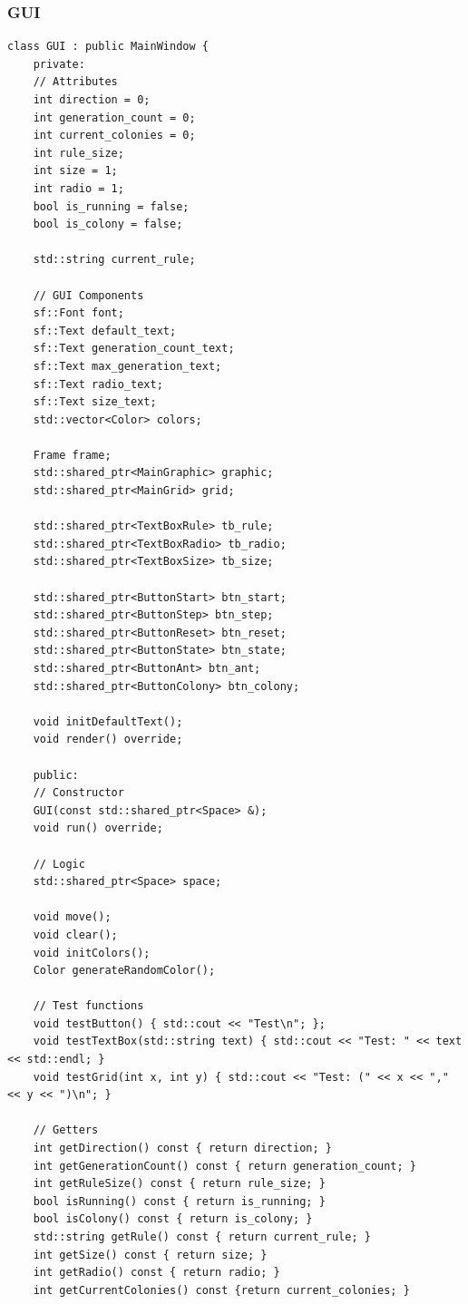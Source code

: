 \documentclass[12pt,twoside]{article}
\begin{document}
\subsubsection{GUI}

\begin{lstlisting}[caption={GUI.hpp}, label={lst:cppexample}]
class GUI : public MainWindow {
	private:
	// Attributes
	int direction = 0;
	int generation_count = 0;
	int current_colonies = 0;
	int rule_size;
	int size = 1;
	int radio = 1;
	bool is_running = false;
	bool is_colony = false;
	
	std::string current_rule;
	
	// GUI Components
	sf::Font font;
	sf::Text default_text;
	sf::Text generation_count_text;
	sf::Text max_generation_text;
	sf::Text radio_text;
	sf::Text size_text;
	std::vector<Color> colors;
	
	Frame frame;
	std::shared_ptr<MainGraphic> graphic;
	std::shared_ptr<MainGrid> grid;
	
	std::shared_ptr<TextBoxRule> tb_rule;
	std::shared_ptr<TextBoxRadio> tb_radio;
	std::shared_ptr<TextBoxSize> tb_size;
	
	std::shared_ptr<ButtonStart> btn_start;
	std::shared_ptr<ButtonStep> btn_step;
	std::shared_ptr<ButtonReset> btn_reset;
	std::shared_ptr<ButtonState> btn_state;
	std::shared_ptr<ButtonAnt> btn_ant;
	std::shared_ptr<ButtonColony> btn_colony;
	
	void initDefaultText();
	void render() override;
	
	public:
	// Constructor
	GUI(const std::shared_ptr<Space> &);
	void run() override;
	
	// Logic
	std::shared_ptr<Space> space;
	
	void move();
	void clear();
	void initColors();
	Color generateRandomColor();
	
	// Test functions
	void testButton() { std::cout << "Test\n"; };
	void testTextBox(std::string text) { std::cout << "Test: " << text << std::endl; }
	void testGrid(int x, int y) { std::cout << "Test: (" << x << "," << y << ")\n"; }
	
	// Getters
	int getDirection() const { return direction; }
	int getGenerationCount() const { return generation_count; }
	int getRuleSize() const { return rule_size; }
	bool isRunning() const { return is_running; }
	bool isColony() const { return is_colony; }
	std::string getRule() const { return current_rule; }
	int getSize() const { return size; }
	int getRadio() const { return radio; }
	int getCurrentColonies() const {return current_colonies; }
	

\end{lstlisting}
\end{document}
